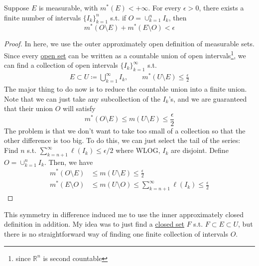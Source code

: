   \begin{theorem}
    \label{thm:measurable-sets-can-be-approximated-by-borel}
    Suppose $E$ is measurable, with $m^\ast (E) < +\infty$. For every $\epsilon > 0$, there exists a finite number of intervals $\{I_k\}_{k=1}^n$ s.t. if $O = \cup_{k=1}^n I_k$, then 
    \begin{equation}
      m^\ast (O \setminus E) + m^\ast (E \setminus O) < \epsilon
    \end{equation}
  \end{theorem}
  \begin{proof}
    In here, we use the outer approximately open definition of measurable sets. Since every \hyperref[pst-def:open-set]{open set} can be written as a countable union of open intervals\footnote{since $\mathbb{R}^n$ is second countable}, we can find a collection of open intervals $\{I_k\}_{k=1}^\infty$ s.t. 
    \begin{align}
      E \subset U \coloneqq \bigcup_{k=1}^\infty I_k, \qquad m^\ast(U \setminus E) \leq \frac{\epsilon}{2}
    \end{align}
    The major thing to do now is to reduce the countable union into a finite union. Note that we can just take any subcollection of the $I_k$'s, and we are guaranteed that their union $O$ will satisfy 
    \begin{equation}
      m^\ast(O \setminus E) \leq m(U \setminus E) \leq \frac{\epsilon}{2}
    \end{equation}
    The problem is that we don't want to take too small of a collection so that the other difference is too big. To do this, we can just select the tail of the series: Find $n$ s.t. $\sum_{k=n+1}^\infty \ell(I_k) \leq \epsilon/2$ where WLOG, $I_k$ are disjoint. Define $O = \cup_{k=1}^n I_k$. Then, we have 
    \begin{align}
      m^\ast (O \setminus E) & \leq m(U \setminus E) \leq \frac{\epsilon}{2} \\ 
      m^\ast (E \setminus O) & \leq m(U \setminus O) \leq \sum_{k=n+1}^\infty \ell(I_k) \leq \frac{\epsilon}{2}
    \end{align}
  \end{proof}

  This symmetry in difference induced me to use the inner approximately closed definition in addition. My idea was to just find a \hyperref[pst-def:closed]{closed set} $F$ s.t. $F \subset E \subset U$, but there is no straightforward way of finding one finite collection of intervals $O$. 

